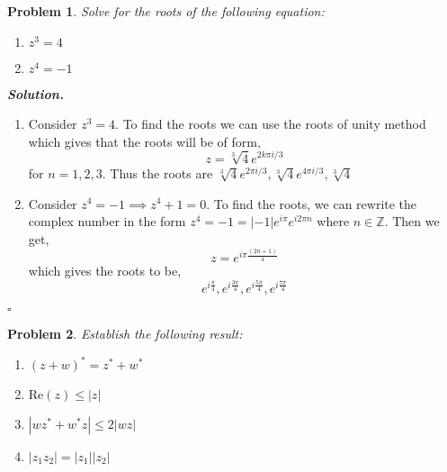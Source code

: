 \documentclass[12pt]{report}
\newtheorem{problem}{Problem}
\newenvironment{solution}[1][\it{Solution}]{\textbf{#1. } }{$\square$}
\def\Z{{\mathbb Z}}
\begin{document}

\begin{problem}
    Solve for the roots of the following equation: 
    \begin{enumerate}
        \item [a.] $z^3 = 4$
        \item [b.] $z^4 = -1$
    \end{enumerate}
\end{problem}

\begin{solution}
    \noindent
    \begin{enumerate}
        \item [a.] 
        Consider $z^3 = 4$. To find the roots we can use the roots of unity method which gives that the roots will be of form, $$z = \sqrt[3]{4}e^{2k\pi i/3}$$ for $n=1,2,3$. Thus the roots are $\sqrt[3]{4}e^{2\pi i/3},\sqrt[3]{4}e^{4\pi i/3},\sqrt[3]{4}$

        \item [b.] 
        Consider $z^4 = -1 \implies z^4 + 1 = 0$. To find the roots, we can rewrite the complex number in the form $z^4 = -1 = |-1|e^{i\pi}e^{i2\pi n}$ where $n \in \Z$. Then we get,
        $$z=e^{i\pi\frac{(2n+1)}{4}}$$
        which gives the roots to be,
        $$e^{i\frac{\pi}{4}},e^{i\frac{3\pi}{4}},e^{i\frac{5\pi}{4}},e^{i\frac{7\pi}{4}}$$
         
    \end{enumerate}
\end{solution}



\begin{problem}
    Establish the following result: 
    \begin{enumerate}
        \item [a.] $(z+w)^*=z^* + w^*$
        \item [d.] $\text{Re}(z) \leq |z|$
        \item [e.] $|wz^* + w^*z| \leq 2|wz|$
        \item [f.] $|z_1z_2| = |z_1||z_2|$
    \end{enumerate}
\end{problem}
\end{document}

